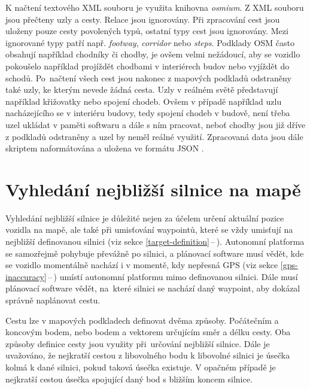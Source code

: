\documentclass[czech, bachelor]{diploma}
\newcommand{\peteref}[1]{\ref{#1}\,--\,\nameref{#1}}
\begin{document}
K načtení textového XML souboru je využita knihovna \emph{osmium}. Z XML souboru jsou přečteny uzly a cesty. Relace jsou
ignorovány. Při zpracování cest jsou uloženy pouze cesty povolených typů, ostatní typy cest jsou ignorovány. Mezi ignorované typy
patří např. \emph{footway}, \emph{corridor} nebo \emph{steps}. Podklady OSM často obsahují například chodníky či chodby, je ovšem
velmi nežádoucí, aby se vozidlo pokoušelo například projíždět chodbami v interiérech budov nebo vyjíždět do schodů. Po~načtení
všech cest jsou nakonec z mapových podkladů odstraněny také uzly, ke kterým nevede žádná cesta. Uzly v reálném světě představují
například křižovatky nebo spojení chodeb. Ovšem v případě například uzlu nacházejícího se v interiéru budovy, tedy spojení chodeb
v budově, není třeba uzel ukládat v paměti softwaru a dále s ním pracovat, neboť chodby jsou již dříve z podkladů odstraněny
a uzel by neměl reálné využití. Zpracovaná data jsou dále skriptem naformátována a uložena ve formátu JSON \cite{json-source}.

\section{Vyhledání nejbližší silnice na mapě}

Vyhledání nejbližší silnice je důležité nejen za účelem určení aktuální pozice vozidla na mapě, ale také při umisťování waypointů,
které se vždy umisťují na nejbližší definovanou silnici (viz sekce \peteref{target-definition}). Autonomní platforma
se samozřejmě pohybuje převážně po silnici, a plánovací software musí vědět, kde se vozidlo momentálně nachází i v momentě,
kdy nepřesná GPS (viz sekce \peteref{gps-inaccuracy}) umístí autonomní platformu mimo definovanou silnici. Dále musí plánovací
software vědět, na~které silnici se nachází daný waypoint, aby dokázal správně naplánovat cestu.

Cestu lze v mapových podkladech definovat dvěma způsoby. Počátečním a koncovým bodem, nebo bodem a vektorem určujícím směr a délku
cesty. Oba způsoby definice cesty jsou využity při~určování nejbližší silnice. Dále je uvažováno, že nejkratší cestou
z libovolného bodu k libovolné silnici je úsečka kolmá k dané silnici, pokud taková úsečka existuje. V opačném případě
je nejkratší cestou úsečka spojující daný bod s bližším koncem silnice.
\end{document}
